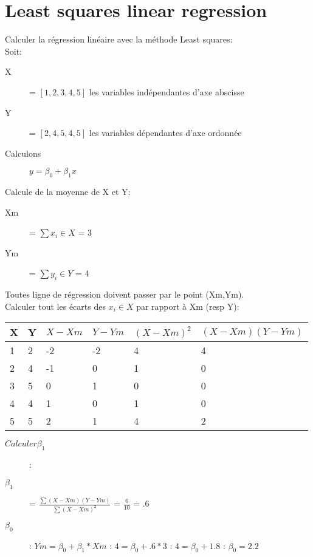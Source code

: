 \pagebreak
\section{Least squares linear regression}
Calculer la régression linéaire avec la méthode Least squares:\\
Soit:
\begin{description}
\item[X] = $[1,2,3,4,5]$ les variables indépendantes d'axe abscisse
\item[Y] = $[2,4,5,4,5]$ les variables dépendantes d'axe ordonnée
\item[Calculons] $y = \beta_0 + \beta_1 x$
\end{description}
Calcule de la moyenne de X et Y:
\begin{description}
\item[Xm] = $ \sum x_i \in X$ = 3
\item[Ym] = $ \sum y_i \in Y$ = 4
\end{description}
Toutes ligne de régression doivent passer par le point (Xm,Ym).\\
Calculer tout les écarts des $x_i \in X$ par rapport à Xm (resp Y):\\

\begin{tabular}{ll|l|l|l|l}
  \hline
  X  & Y & $X - Xm$ & $Y - Ym$ & $(X-Xm)^2$ & $(X-Xm)(Y-Ym)$\\
  \hline
  1 & 2 & -2 & -2 & 4 & 4\\
  2 & 4 & -1 & 0  & 1 & 0\\
  3 & 5 & 0  & 1  & 0 & 0\\
  4 & 4 & 1  & 0  & 1 & 0\\
  5 & 5 & 2  & 1  & 4 & 2\\ 
  \hline
\end{tabular}

\begin{description}
\item[$Calculer \beta_1$]:
\item[$ \beta_1 $] = $ \frac{ \sum (X-Xm)(Y-Ym)}{ \sum (X-Xm)^2}$ = $\frac{6}{10}$ = $.6$
\item[$ \beta_0 $]: $Ym = \beta_0 + \beta_1 * Xm$ : $4 = \beta_0 + .6 * 3$ : $4= \beta_0 + 1.8$ : $\beta_0 = 2.2$
\end{description}
\pagebreak
